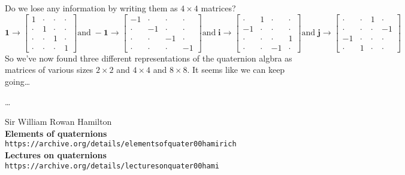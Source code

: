 \documentclass[12pt]{article}
\newcommand{\one}{\mathbf{1}}
\newcommand{\ii}{\mathbf{i}}
\newcommand{\jj}{\mathbf{j}}
\begin{document}
Do we lose any information by writing them as  $4 \times 4$ matrices?
$$\one \to \left[ \begin{array}{cccc} 1 & \cdot & \cdot & \cdot \\ 
\cdot & 1 & \cdot  & \cdot \\ 
\cdot & \cdot & 1 & \cdot \\
\cdot & \cdot & \cdot & 1  \end{array} \right] \text{and}\; -\one \to \left[ \begin{array}{cccc} -1 & \cdot & \cdot & \cdot \\ 
\cdot & -1 & \cdot  & \cdot \\ 
\cdot & \cdot & -1 & \cdot \\
\cdot & \cdot & \cdot & -1  \end{array} \right] \text{and}\;
\ii \to \left[
\begin{array}{cccc} \cdot & 1 & \cdot & \cdot \\ 
-1 & \cdot & \cdot & \cdot \\ 
\cdot & \cdot & \cdot & 1 \\
\cdot & \cdot & -1 & \cdot \end{array} \right] \text{and}\;
\jj \to \left[ \begin{array}{cccc} \cdot & \cdot & 1 & \cdot \\
\cdot & \cdot & \cdot & -1 \\ 
-1 & \cdot & \cdot & \cdot  \\ 
\cdot & 1 & \cdot & \cdot \end{array}\right] $$
So we've now found three different representations of the quaternion algbra as matrices of various sizes $2 \times 2$ and $4 \times 4$ and $8 \times 8$.  It seems like we can keep going\dots 

\vfill 




\vfill

\begin{thebibliography}{}

\item \dots

\item Sir William Rowan Hamilton \\ 
\textbf{Elements of quaternions} \texttt{https://archive.org/details/elementsofquater00hamirich} \\
\textbf{Lectures on quaternions} \texttt{https://archive.org/details/lecturesonquater00hami}

\end{thebibliography}
\end{document}
